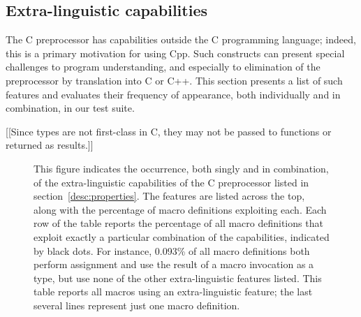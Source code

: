 \documentclass[10pt]{article}
\begin{document}





\subsection{Extra-linguistic capabilities}

The C preprocessor has capabilities outside the C programming language;
indeed, this is a primary motivation for using Cpp.  Such constructs
can present special challenges to program understanding, and especially to
elimination of the preprocessor by translation into C or C++.  This section
presents a list of such features and evaluates their frequency of
appearance, both individually and in combination,  in our test suite.

[[Since types are not first-class in C, they may not be passed to functions
or returned as results.]]

\begin{figure}
  {\small\centerline{}}
  
  \caption{This figure indicates the occurrence, both singly and in
  combination, of the extra-linguistic capabilities of the C preprocessor
  listed in section~\ref{desc:properties}.  The features are listed across
  the top, along with the percentage of macro definitions exploiting each.
  Each row of the table reports the percentage of all macro definitions
  that exploit exactly a particular combination of the capabilities,
  indicated by black dots.  For instance, 0.093\% of all macro
  definitions both perform assignment and use the result of a macro
  invocation as a type, but use none of the other extra-linguistic features
  listed.  This table reports all macros using an extra-linguistic feature;
  the last several lines represent just one macro definition.}
  \label{fig:subset-properties}
\end{figure}
\end{document}
